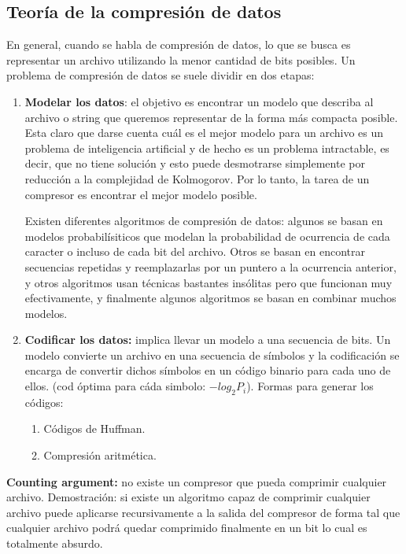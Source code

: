 \documentclass[titlepage,a4paper]{article}
\begin{document}
\subsection*{Teoría de la compresión de datos}
En general, cuando se habla de compresión de datos, lo que se busca es representar un archivo utilizando la menor cantidad de bits posibles. Un problema de compresión de datos se suele dividir en dos etapas: 
\begin{enumerate}
\item \textbf{Modelar los datos}: el objetivo es encontrar un modelo que describa al archivo o string que queremos representar de la forma más compacta posible. Esta claro que darse cuenta cuál es el mejor modelo para un archivo es un problema de inteligencia artificial y de hecho es un problema intractable, es decir, que no tiene solución y esto puede desmotrarse simplemente por reducción a la complejidad de Kolmogorov. Por lo tanto, la tarea de un compresor es encontrar el mejor modelo posible.

 Existen diferentes algoritmos de compresión de datos: algunos se basan en modelos probabilísiticos que modelan la probabilidad de ocurrencia de cada caracter o incluso de cada bit del archivo. Otros se basan en encontrar secuencias repetidas y reemplazarlas por un puntero a la ocurrencia anterior, y otros algoritmos usan técnicas bastantes insólitas pero que funcionan muy efectivamente, y finalmente algunos algoritmos se basan en combinar muchos modelos. 
\item \textbf{Codificar los datos:} implica llevar un modelo a una secuencia de bits. Un modelo convierte un archivo en una secuencia de símbolos y la codificación se encarga de convertir dichos símbolos en un código binario para cada uno de ellos. (cod óptima para cáda simbolo: $-log_2P_i$). Formas para generar los códigos: 
\begin{enumerate}
\item Códigos de Huffman.
\item Compresión aritmética. 
\end{enumerate}
\end{enumerate}

\textbf{Counting argument:} no existe un compresor que pueda comprimir cualquier archivo. Demostración: si existe un algoritmo capaz de comprimir cualquier archivo puede aplicarse recursivamente a la salida del compresor de forma tal que cualquier archivo podrá quedar comprimido finalmente en un bit lo cual es totalmente absurdo. \\
\end{document}
